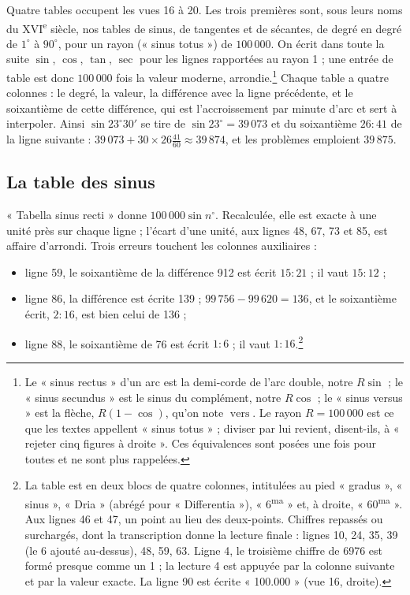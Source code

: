 \documentclass[11pt,a4paper]{article}
\begin{document}
Quatre tables occupent les vues 16 à 20. Les trois premières sont, sous leurs
noms du XVI\textsuperscript{e} siècle, nos tables de sinus, de tangentes et de
sécantes, de degré en degré de $1^\circ$ à $90^\circ$, pour un rayon (« sinus
totus ») de $100\,000$. On écrit dans toute la suite $\sin$, $\cos$, $\tan$,
$\sec$ pour les lignes rapportées au rayon 1 ; une entrée de table est donc
$100\,000$ fois la valeur moderne, arrondie.\footnote{Le « sinus rectus » d'un arc
est la demi-corde de l'arc double, notre $R\sin$ ; le « sinus secundus » est le
sinus du complément, notre $R\cos$ ; le « sinus versus » est la flèche,
$R(1-\cos)$, qu'on note $\operatorname{vers}$. Le rayon $R = 100\,000$ est ce que
les textes appellent « sinus totus » ; diviser par lui revient, disent-ils, à
« rejeter cinq figures à droite ». Ces équivalences sont posées une fois pour
toutes et ne sont plus rappelées.} Chaque table a quatre colonnes : le degré,
la valeur, la différence avec la ligne précédente, et le soixantième de cette
différence, qui est l'accroissement par minute d'arc et sert à interpoler. Ainsi
$\sin 23^\circ 30'$ se tire de $\sin 23^\circ = 39\,073$ et du soixantième
$26{:}41$ de la ligne suivante : $39\,073 + 30 \times 26\tfrac{41}{60} \approx
39\,874$, et les problèmes emploient $39\,875$.

\subsection*{La table des sinus}

« Tabella sinus recti » donne $100\,000\sin n^\circ$. Recalculée, elle est exacte
à une unité près sur chaque ligne ; l'écart d'une unité, aux lignes 48, 67, 73 et
85, est affaire d'arrondi. Trois erreurs touchent les colonnes auxiliaires :

\begin{itemize}
  \item ligne 59, le soixantième de la différence 912 est écrit $15{:}21$ ; il
    vaut $15{:}12$ ;
  \item ligne 86, la différence est écrite 139 ; $99\,756 - 99\,620 = 136$, et le
    soixantième écrit, $2{:}16$, est bien celui de 136 ;
  \item ligne 88, le soixantième de 76 est écrit $1{:}6$ ; il vaut
    $1{:}16$.\footnote{La table est en deux blocs de quatre colonnes, intitulées
    au pied « gradus », « sinus », « Dria » (abrégé pour « Differentia »),
    « 6\textsuperscript{ma} » et, à droite, « 60\textsuperscript{ma} ». Aux lignes
    46 et 47, un point au lieu des deux-points. Chiffres repassés ou surchargés,
    dont la transcription donne la lecture finale : lignes 10, 24, 35, 39 (le 6
    ajouté au-dessus), 48, 59, 63. Ligne 4, le troisième chiffre de 6976 est formé
    presque comme un 1 ; la lecture 4 est appuyée par la colonne suivante et par
    la valeur exacte. La ligne 90 est écrite « 100.000 » (vue 16, droite).}
\end{itemize}
\end{document}
